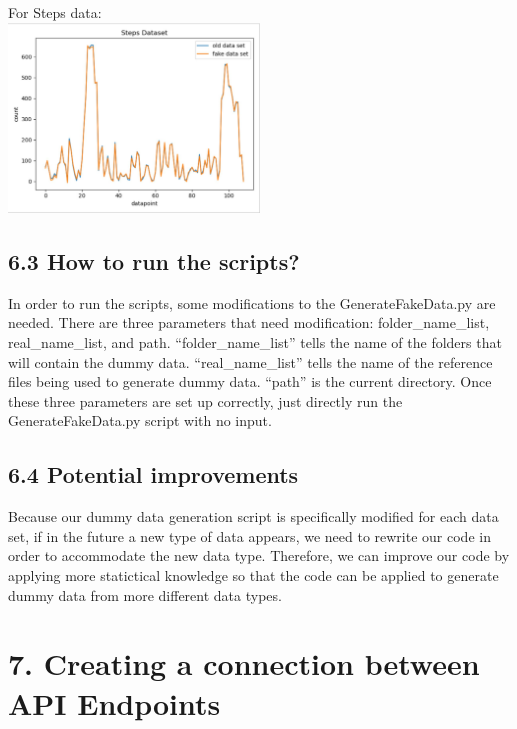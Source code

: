 \documentclass[]{book}
\begin{document}
For Steps data:\\
\includegraphics[width=0.5\textwidth,height=\textheight]{./images/Steps Data.JPG}

\hypertarget{how-to-run-the-scripts}{%
\subsection{6.3 How to run the scripts?}\label{how-to-run-the-scripts}}

In order to run the scripts, some modifications to the GenerateFakeData.py are needed. There are three parameters that need modification: folder\_name\_list, real\_name\_list, and path. ``folder\_name\_list'' tells the name of the folders that will contain the dummy data. ``real\_name\_list'' tells the name of the reference files being used to generate dummy data. ``path'' is the current directory. Once these three parameters are set up correctly, just directly run the GenerateFakeData.py script with no input.

\hypertarget{potential-improvements}{%
\subsection{6.4 Potential improvements}\label{potential-improvements}}

Because our dummy data generation script is specifically modified for each data set, if in the future a new type of data appears, we need to rewrite our code in order to accommodate the new data type. Therefore, we can improve our code by applying more statictical knowledge so that the code can be applied to generate dummy data from more different data types.

\hypertarget{creating-a-connection-between-api-endpoints}{%
\section{7. Creating a connection between API Endpoints}\label{creating-a-connection-between-api-endpoints}}
\end{document}
